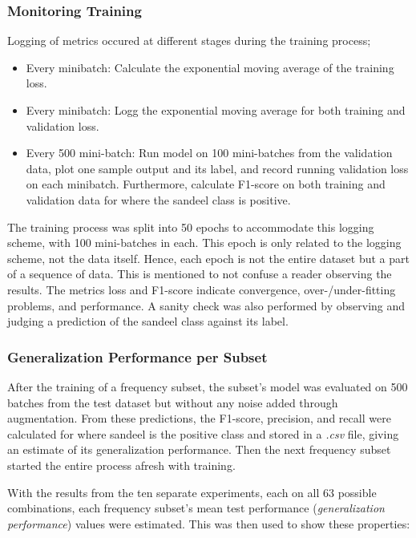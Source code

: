         \subsubsection{Monitoring Training}
        Logging of metrics occured at different stages during the training process;
            \begin{itemize}
                \item Every minibatch: Calculate the exponential moving average of the training loss.
                \item Every minibatch: Logg the exponential moving average for both training and validation loss.
                \item Every 500 mini-batch: Run model on 100 mini-batches from the validation data, plot one sample output and its label, and record running validation loss on each minibatch. Furthermore, calculate F1-score on both training and validation data for where the sandeel class is positive.
            \end{itemize}
            
        The training process was split into 50 epochs to accommodate this logging scheme, with 100 mini-batches in each. This epoch is only related to the logging scheme, not the data itself. Hence, each epoch is not the entire dataset but a part of a sequence of data. This is mentioned to not confuse a reader observing the results. The metrics loss and F1-score indicate convergence, over-/under-fitting problems, and performance. A sanity check was also performed by observing and judging a prediction of the sandeel class against its label.
        
        \subsubsection{Generalization Performance per Subset}
        After the training of a frequency subset, the subset’s model was evaluated on 500 batches from the test dataset but without any noise added through augmentation. From these predictions, the F1-score, precision, and recall were calculated for where sandeel is the positive class and stored in a \textit{.csv} file, giving an estimate of its generalization performance. Then the next frequency subset started the entire process afresh with training.
        
        With the results from the ten separate experiments, each on all 63 possible combinations, each frequency subset's mean test performance (\textit{generalization performance}) values were estimated. This was then used to show these properties:
        

